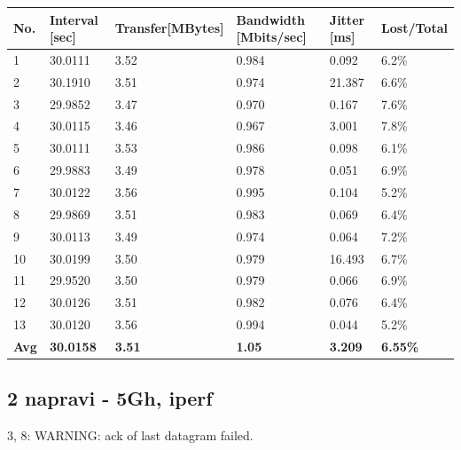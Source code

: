 \documentclass[11pt,a4paper,slovene]{article}
\begin{document}
\begin{table}[H]
	\begin{adjustwidth}{-3cm}{-3cm}
	\centering
		\begin{tabular}{l|l|l|l|l|l}
		\hline
		\textbf{No.} & \textbf{Interval [sec]} & \textbf{Transfer[MBytes]} & \textbf{Bandwidth [Mbits/sec]} & \textbf{Jitter [ms]} & \textbf{Lost/Total} \\
     	\hline
     	1 & 30.0111 & 3.52 & 0.984 & 0.092 & 6.2\% \\
  		2 & 30.1910 & 3.51 & 0.974 & 21.387 & 6.6\% \\
  		3 & 29.9852 & 3.47 & 0.970 & 0.167 & 7.6\% \\
  		4 & 30.0115 & 3.46 & 0.967 & 3.001 & 7.8\% \\
  		5 & 30.0111 & 3.53 & 0.986 & 0.098 & 6.1\% \\
  		6 & 29.9883 & 3.49 & 0.978 & 0.051 & 6.9\% \\
  		7 & 30.0122 & 3.56 & 0.995 & 0.104 & 5.2\% \\
  		8 & 29.9869 & 3.51 & 0.983 & 0.069 & 6.4\% \\
  		9 & 30.0113 & 3.49 & 0.974 & 0.064 & 7.2\% \\
  		10 & 30.0199 & 3.50 & 0.979 & 16.493 & 6.7\% \\
  		11 & 29.9520 & 3.50 & 0.979 & 0.066 & 6.9\% \\
  		12 & 30.0126 & 3.51 & 0.982 & 0.076 & 6.4\% \\
  		13 & 30.0120 & 3.56 & 0.994 & 0.044 & 5.2\% \\
  		\hline
  		\textbf{Avg} & \textbf{30.0158} & \textbf{3.51} & \textbf{1.05} & \textbf{3.209} & \textbf{6.55\%} \\
  		\hline
    		\end{tabular}
    	\end{adjustwidth}
\end{table}

\subsection{2 napravi - 5Gh, iperf}

3, 8: WARNING: ack of last datagram failed.
\end{document}
